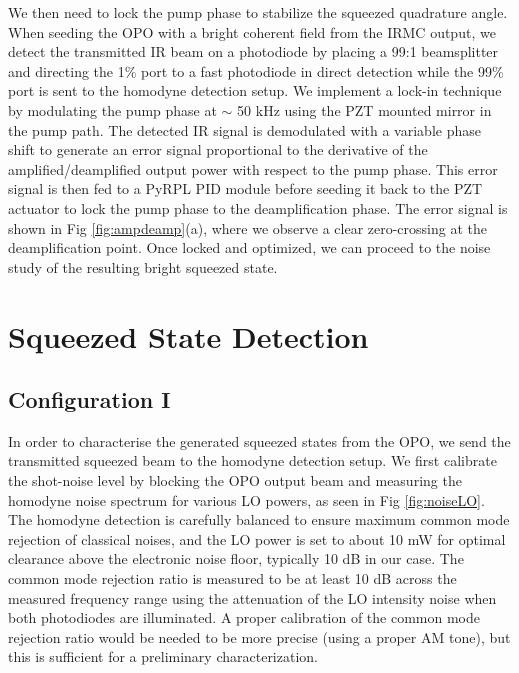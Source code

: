 We then need to lock the pump phase to stabilize the squeezed quadrature angle. When seeding the OPO with a bright coherent field from the IRMC output, we detect the transmitted IR beam on a photodiode by placing a 99:1 beamsplitter and directing the 1\% port to a fast photodiode in direct detection while the 99\% port is sent to the homodyne detection setup. We implement a lock-in technique by modulating the pump phase at $\sim$ 50 kHz using the PZT mounted mirror in the pump path. The detected IR signal is demodulated with a variable phase shift to generate an error signal proportional to the derivative of the amplified/deamplified output power with respect to the pump phase. This error signal is then fed to a PyRPL PID module before seeding it back to the PZT actuator to lock the pump phase to the deamplification phase. The error signal is shown in Fig \ref{fig:ampdeamp}(a), where we observe a clear zero-crossing at the deamplification point. Once locked and optimized, we can proceed to the noise study of the resulting bright squeezed state. 
\section{Squeezed State Detection}

\subsection{Configuration I}\label{sec:bright_squeezingI}
In order to characterise the generated squeezed states from the OPO, we send the transmitted squeezed beam to the homodyne detection setup. We first calibrate the shot-noise level by blocking the OPO output beam and measuring the homodyne noise spectrum for various LO powers, as seen in Fig \ref{fig:noiseLO}. The homodyne detection is carefully balanced to ensure maximum common mode rejection of classical noises, and the LO power is set to about 10 mW for optimal clearance above the electronic noise floor, typically 10 dB in our case. The common mode rejection ratio is measured to be at least 10 dB across the measured frequency range using the attenuation of the LO intensity noise when both photodiodes are illuminated. A proper calibration of the common mode rejection ratio would be needed to be more precise (using a proper AM tone), but this is sufficient for a preliminary characterization. \\

